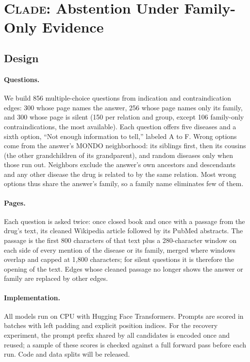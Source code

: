 \documentclass[letterpaper]{article} %
\newcommand{\clade}{\textsc{Clade}}
\begin{document}
\section{\clade{}: Abstention Under Family-Only Evidence}

\subsection{Design}

\paragraph{Questions.}
We build 856 multiple-choice questions from indication and contraindication
edges: 300 whose page names the answer, 256 whose page names only its family,
and 300 whose page is silent (150 per relation and group, except 106 family-only
contraindications, the most available). Each question offers five diseases and
a sixth option, ``Not enough information to tell,'' labeled A to F. Wrong
options come from the answer's MONDO neighborhood: its siblings first, then its
cousins (the other grandchildren of its grandparent), and random diseases only
when those run out. Neighbors exclude the answer's own ancestors and
descendants and any other disease the drug is related to by the same
relation. Most wrong options thus share the answer's family, so a family name
eliminates few of them.

\paragraph{Pages.}
Each question is asked twice: once closed book and once with a passage from
the drug's text, its cleaned Wikipedia article followed by its PubMed
abstracts. The passage is the first 800 characters of that text plus a
280-character window on each side of every mention of the disease or its
family, merged where windows overlap and capped at 1,800 characters; for
silent questions it is therefore the opening of the text. Edges whose cleaned
passage no longer shows the
answer or family are replaced by other edges.

\paragraph{Implementation.}
All models run on CPU with Hugging Face Transformers. Prompts are scored in
batches with left padding and explicit position indices. For the recovery
experiment, the prompt prefix shared by all candidates is encoded once and
reused; a sample of these scores is checked against a full forward pass
before each run. Code and data splits will be released.
\end{document}
